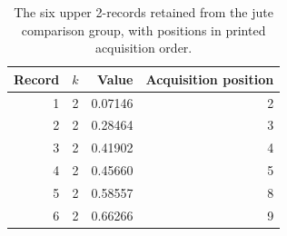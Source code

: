 \begin{table}[htbp]
\centering
\caption{The six upper 2-records retained from the jute comparison group, with positions in printed acquisition order.}\label{tab:jute-records}
\small
\begin{tabular}{rrrr}
\toprule
Record & $k$ & Value & Acquisition position \\
\midrule
1 & 2 & 0.07146 & 2 \\
2 & 2 & 0.28464 & 3 \\
3 & 2 & 0.41902 & 4 \\
4 & 2 & 0.45660 & 5 \\
5 & 2 & 0.58557 & 8 \\
6 & 2 & 0.66266 & 9 \\
\bottomrule
\end{tabular}
\end{table}
